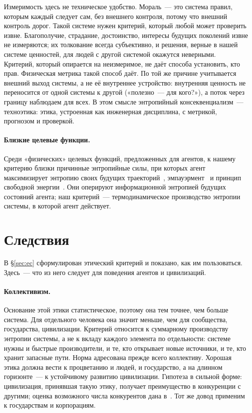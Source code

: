 \documentclass[11pt,a4paper]{article}
\newcommand{\Sref}[1]{\hyperref[#1]{\S\ref{#1}}}
\begin{document}
Измеримость здесь не техническое удобство. Мораль~--- это система правил, которым каждый следует сам, без внешнего контроля, потому что внешний контроль дорог. Такой системе нужен критерий, который любой может проверить извне. Благополучие, страдание, достоинство, интересы будущих поколений извне не измеряются; их толкование всегда субъективно, и решения, верные в нашей системе ценностей, для людей с другой системой окажутся неверными. Критерий, который опирается на неизмеримое, не даёт способа установить, кто прав. Физическая метрика такой способ даёт. По той же причине учитывается внешний выход системы, а не её внутреннее устройство: внутренняя ценность не переносится от одной системы к другой («полезно~--- для кого?»), а поток через границу наблюдаем для всех. В этом смысле энтропийный консеквенциализм~--- техноэтика: этика, устроенная как инженерная дисциплина, с метрикой, прогнозом и проверкой.

\paragraph{Близкие целевые функции.}
Среди «физических» целевых функций, предложенных для агентов, к нашему критерию близки причинные энтропийные силы, при которых агент максимизирует энтропию своих будущих траекторий~\cite{wissnergross2013}, эмпауэрмент~\cite{klyubin2005} и принцип свободной энергии~\cite{friston2010}. Они оперируют информационной энтропией будущих состояний агента; наш критерий~--- термодинамическое производство энтропии системы, в которой агент действует.

\section{Следствия}\label{sec:consequences}

В \Sref{sec:ec} сформулирован этический критерий и показано, как им пользоваться. Здесь~--- что из него следует для поведения агентов и цивилизаций.

\paragraph{Коллективизм.}
Основание этой этики статистическое, поэтому она тем точнее, чем больше система. Для отдельного человека она значит меньше, чем для сообщества, государства, цивилизации. Критерий относится к суммарному производству энтропии системы, а не к вкладу каждого элемента по отдельности: системе нужны и быстрые производители, и те, кто открывает новые источники, и те, кто хранит запасные пути. Норма адресована прежде всего коллективу. Хорошая этика должна вести к процветанию и людей, и государство, а на длинном горизонте~--- к устойчивому развитию цивилизации. Гипотеза в сильной форме: цивилизация, принявшая такую этику, получает преимущество в конкуренции с другими; оценка возможного числа конкурентов дана в~\cite{ponfilenok2026critical}. Тот же довод применим к государствам и корпорациям.
\end{document}
